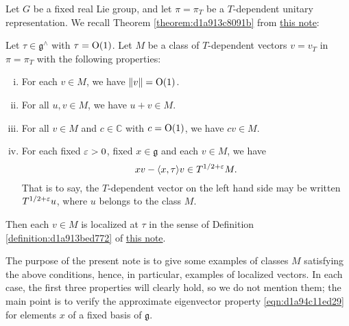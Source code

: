\documentclass[reqno]{amsart} 
\numberwithin{equation}{section}
\begin{document}
Let $G$ be a fixed real Lie group, and let $\pi = \pi_T$ be a $T$-dependent unitary representation.  We recall Theorem \ref{theorem:d1a913c8091b} from \href{20230522T150333__microlocal-localized-vectors.pdf}{this note}:
\begin{theorem}\label{theorem:d1a94d0ddd25}
  Let $\tau \in \mathfrak{g}^\wedge$ with $\tau = \operatorname{O}(1)$.  Let $M$ be a class of $T$-dependent vectors $v = v_T$ in $\pi = \pi_T$ with the following properties:
  \begin{enumerate}[(i)]
  \item For each $v \in M$, we have $\lVert v \rVert = \operatorname{O}(1)$.
  \item For all $u, v \in M$, we have $u + v \in M$.
  \item For all $v \in M$ and $c \in \mathbb{C}$ with $c = \operatorname{O}(1)$, we have $c v \in M$.
  \item For each fixed $\varepsilon > 0$, fixed $x \in \mathfrak{g}$ and each $v \in M$, we have
    \begin{equation}\label{eqn:d1a94c11ed29}
      x v - \langle x, \tau  \rangle v \in T^{1/2+\varepsilon} M.
    \end{equation}
    That is to say, the $T$-dependent vector on the left hand side may be written $T^{1/2+\varepsilon} u$, where $u$ belongs to the class $M$.
  \end{enumerate}
  Then each $v \in M$ is localized at $\tau$ in the sense of Definition \ref{definition:d1a913bed772} of \href{20230522T150333__microlocal-localized-vectors.pdf}{this note}.
\end{theorem}

The purpose of the present note is to give some examples of classes $M$ satisfying the above conditions, hence, in particular, examples of localized vectors.  In each case, the first three properties will clearly hold, so we do not mention them; the main point is to verify the approximate eigenvector property \eqref{eqn:d1a94c11ed29} for elements $x$ of a fixed basis of $\mathfrak{g}$.
\end{document}
